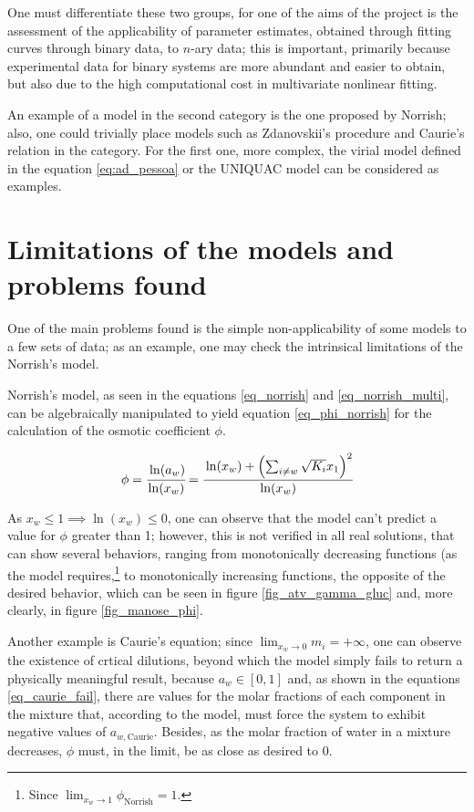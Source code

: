 One must differentiate these two groups, for one of the aims of the project
is the assessment of the applicability of parameter estimates, obtained through
fitting curves through binary data, to $n$-ary data; this is important, primarily
because experimental data for binary systems are more abundant and easier to
obtain, but also due to the high computational cost in multivariate nonlinear
fitting.

An example of a model in the second category is the one proposed by Norrish; also,
one could trivially place models such as Zdanovskii's procedure and Caurie's
relation in the category. For the first one, more complex, the virial model defined
in the equation \ref{eq:ad_pessoa} or the UNIQUAC model can be considered as
examples.

\section{Limitations of the models and problems found}

One of the main problems found is the simple non-applicability of some models
to a few sets of data; as an example, one may check the intrinsical limitations
of the Norrish's model.

Norrish's model, as seen in the equations \ref{eq_norrish} and
\ref{eq_norrish_multi}, can be algebraically manipulated to yield equation
\ref{eq_phi_norrish} for the calculation of the osmotic coefficient $\phi$.

\begin{equation}
	\label{eq_phi_norrish}
	\phi = \cfrac{\ln(a_w)}{\ln(x_w)} = \cfrac{\ln(x_w) + \left(\sum_{ i\neq w}
	\sqrt{K_i}x_1\right)^2}{\ln(x_w)}
\end{equation}

As $x_w \le 1 \implies \ln(x_w) \le 0$, one can observe that the model can't
predict a value for $\phi$ greater than 1; however, this is not verified
in all real solutions, that can show several behaviors, ranging from
monotonically decreasing functions (as the model requires,\footnote{%
	Since $\lim_{x_w \to 1}\phi_\text{Norrish} = 1$.
} to monotonically increasing functions, the opposite of the desired
behavior, which can be seen in figure \ref{fig_atv_gamma_gluc}
and, more clearly, in figure \ref{fig_manose_phi}.

Another example is Caurie's equation; since $\lim_{x_w \to 0}m_i = +\infty$,
one can observe the existence of crtical dilutions, beyond which the
model simply fails to return a physically meaningful result, because
$a_w \in [0,1]$ and, as shown in the equations \ref{eq_caurie_fail},
there are values for the molar fractions of each component in the mixture
that, according to the model, must force the system to exhibit negative
values of $a_{w,\text{Caurie}}$. Besides, as the molar fraction of water
in a mixture decreases, $\phi$ must, in the limit, be as close as
desired to 0.

